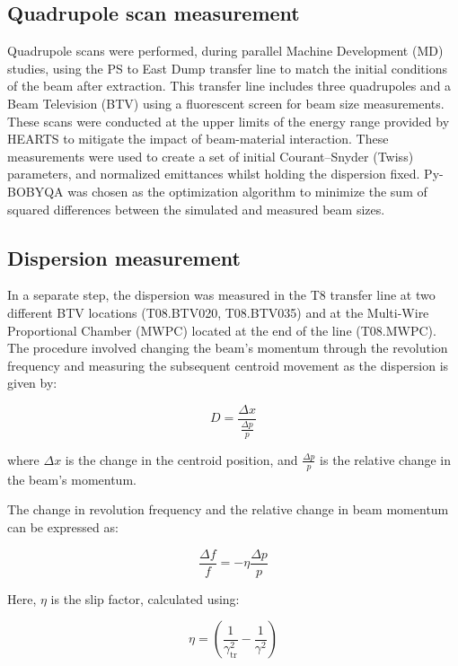 \documentclass[a4paper,
               biblatex,     %
               ]{jacow}
\begin{document}
\subsection{Quadrupole scan measurement}

 Quadrupole scans were performed, during parallel Machine Development (MD) studies, using the PS to East Dump transfer line to match the initial conditions of the beam after extraction. This transfer line includes three quadrupoles and a Beam Television (BTV) using a fluorescent screen for beam size measurements. These scans were conducted at the upper limits of the energy range provided by HEARTS to mitigate the impact of beam-material interaction. These measurements were used to create a set of initial Courant–Snyder (Twiss) parameters, and normalized emittances whilst holding the dispersion fixed. Py-BOBYQA \cite{cartis_escaping_2022, cartis_improving_2019} was chosen as the optimization algorithm to minimize the sum of squared differences between the simulated and measured beam sizes.


\subsection{Dispersion measurement}

In a separate step, the dispersion was measured in the T8 transfer line at two different BTV locations (T08.BTV020, T08.BTV035) and at the Multi-Wire Proportional Chamber (MWPC) located at the end of the line (T08.MWPC). The procedure involved changing the beam's momentum through the revolution frequency and measuring the subsequent centroid movement as the dispersion is given by:

\begin{equation}
D = \frac{\Delta x}{\frac{\Delta p}{p}}
\end{equation}

where $\Delta x$ is the change in the centroid position, and $\frac{\Delta p}{p}$ is the relative change in the beam's momentum.

The change in revolution frequency and the relative change in beam momentum can be expressed as:

\begin{equation}
\frac{\Delta f}{f} = -\eta \frac{\Delta p}{p}
\end{equation}

Here, $\eta$ is the slip factor, calculated using:

\begin{equation}
\eta = \left(\frac{1}{\gamma_{\text{tr}}^{2}} - \frac{1}{\gamma^{2}}\right)
\end{equation}
\end{document}
